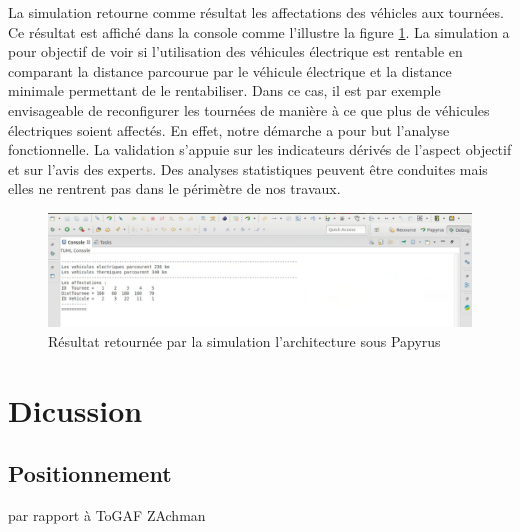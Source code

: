 La simulation retourne comme résultat les affectations des véhicles aux tournées. Ce résultat est affiché dans la console comme l'illustre la figure \ref{fig:resultat_simu}. La simulation a pour objectif de voir si l'utilisation des véhicules électrique est rentable en comparant la distance parcourue par le véhicule électrique et la distance minimale permettant de le rentabiliser. Dans ce cas, il est par exemple envisageable de reconfigurer les tournées de manière à ce que plus de véhicules électriques soient affectés. En effet, notre démarche a pour but l'analyse fonctionnelle. La validation s'appuie sur les indicateurs dérivés de l'aspect objectif et sur l'avis des experts. Des analyses statistiques peuvent être conduites mais elles ne rentrent pas dans le périmètre de nos travaux.


\begin{figure}[!htbp]
 \begin{center}
  \includegraphics[width=1\textwidth]{figures/5_implementation/resultat_simu.png}
 \end{center}
 \caption{Résultat retournée par la simulation l'architecture sous Papyrus}
 \label{fig:resultat_simu}
\end{figure} 


 


\section{Dicussion}

    \subsection{Positionnement}
par rapport à ToGAF
ZAchman

